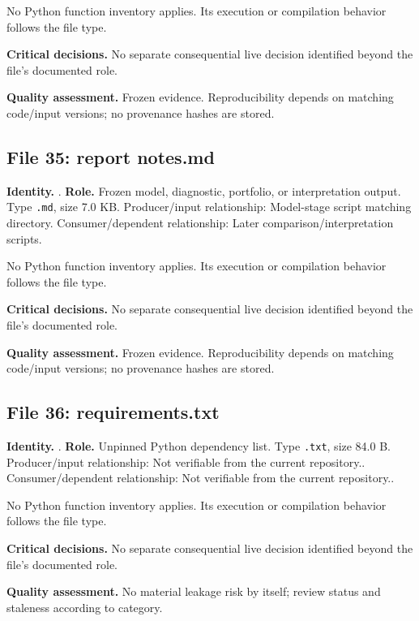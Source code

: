 \documentclass[
  11pt,
  a4paper]{article}
\begin{document}
No Python function inventory applies. Its execution or compilation
behavior follows the file type.

\textbf{Critical decisions.} No separate consequential live decision
identified beyond the file's documented role.

\textbf{Quality assessment.} Frozen evidence. Reproducibility depends on
matching code/input versions; no provenance hashes are stored.

\subsection{File 35: report notes.md}\label{file-637333304353114175}

\textbf{Identity.} .
\textbf{Role.} Frozen model, diagnostic, portfolio, or interpretation
output. Type \texttt{.md}, size 7.0 KB. Producer/input relationship:
Model-stage script matching directory. Consumer/dependent relationship:
Later comparison/interpretation scripts.

No Python function inventory applies. Its execution or compilation
behavior follows the file type.

\textbf{Critical decisions.} No separate consequential live decision
identified beyond the file's documented role.

\textbf{Quality assessment.} Frozen evidence. Reproducibility depends on
matching code/input versions; no provenance hashes are stored.

\subsection{File 36: requirements.txt}\label{file-4942946771469595678}

\textbf{Identity.} . \textbf{Role.} Unpinned
Python dependency list. Type \texttt{.txt}, size 84.0 B. Producer/input
relationship: Not verifiable from the current repository..
Consumer/dependent relationship: Not verifiable from the current
repository..

No Python function inventory applies. Its execution or compilation
behavior follows the file type.

\textbf{Critical decisions.} No separate consequential live decision
identified beyond the file's documented role.

\textbf{Quality assessment.} No material leakage risk by itself; review
status and staleness according to category.
\end{document}
